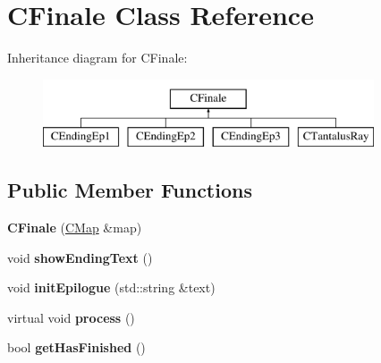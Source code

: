 \hypertarget{class_c_finale}{
\section{CFinale Class Reference}
\label{class_c_finale}
}
Inheritance diagram for CFinale:\begin{figure}[H]
\begin{center}
\leavevmode
\includegraphics[height=2cm]{class_c_finale}
\end{center}
\end{figure}
\subsection*{Public Member Functions}
\begin{DoxyCompactItemize}
\item 
\hypertarget{class_c_finale_a6ca86c8289ebc4cb0299ae95199c1ca8}{
{\bfseries CFinale} (\hyperlink{class_c_map}{CMap} \&map)}
\label{class_c_finale_a6ca86c8289ebc4cb0299ae95199c1ca8}

\item 
\hypertarget{class_c_finale_a0b48b2d23eb04d3d4e896a9271774367}{
void {\bfseries showEndingText} ()}
\label{class_c_finale_a0b48b2d23eb04d3d4e896a9271774367}

\item 
\hypertarget{class_c_finale_a583de2e05cc8d65c6dcbdf9d3eebef55}{
void {\bfseries initEpilogue} (std::string \&text)}
\label{class_c_finale_a583de2e05cc8d65c6dcbdf9d3eebef55}

\item 
\hypertarget{class_c_finale_ac43d7c8fde29f34eabd23bb9133839b4}{
virtual void {\bfseries process} ()}
\label{class_c_finale_ac43d7c8fde29f34eabd23bb9133839b4}

\item 
\hypertarget{class_c_finale_a3b66f80a616301f208fbbf341a4ce8e7}{
bool {\bfseries getHasFinished} ()}
\label{class_c_finale_a3b66f80a616301f208fbbf341a4ce8e7}

\end{DoxyCompactItemize}
